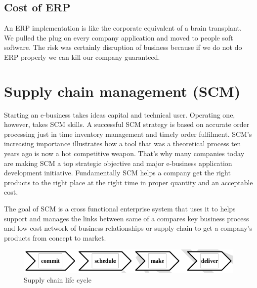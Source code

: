\documentclass[12pt, a4paper]{article}
\begin{document}
\subsection{Cost of ERP}
\vskip10pt
An ERP implementation is like the corporate equivalent of a brain transplant. We pulled the plug on every company application and moved to people soft software. The risk was certainly disruption of business because if we do not do ERP properly we can kill our company guaranteed.


\section{Supply chain management (SCM)}
Starting an e-business takes ideas capital and technical user. Operating one, however, takes SCM skills. A successful SCM strategy is based on accurate order processing just in time inventory management and timely order fulfilment. SCM’s increasing importance illustrates how a tool that was a theoretical process ten years ago is now a hot competitive weapon. That’s why many companies today are making SCM a top strategic objective and major e-business application development initiative. Fundamentally SCM helps a company get the right products to the right place at the right time in proper quantity and an acceptable cost.

The goal of SCM is a cross functional enterprise system that uses it to helps support and manages the links between same of a compares key business process and low cost network of business relationships or supply chain to get a company’s products from concept to market.

\begin{figure}[ht]
  \includegraphics[width=\columnwidth]{scmlc}
  \caption{Supply chain life cycle}
\end{figure}
\end{document}
